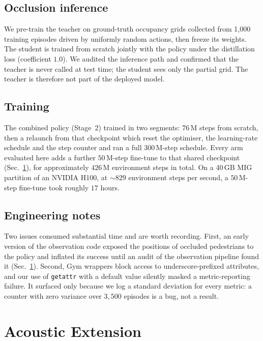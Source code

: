 \documentclass[conference]{IEEEtran}
\begin{document}
\subsection{Occlusion inference}
We pre-train the teacher on ground-truth occupancy grids collected from 1{,}000 training
episodes driven by uniformly random actions, then freeze its weights. The student is trained
from scratch jointly with the policy under the distillation loss (coefficient $1.0$). We audited
the inference path and confirmed that the teacher is never called at test time; the student
sees only the partial grid. The teacher is therefore not part of the deployed model.

\subsection{Training}
The combined policy (Stage~2) trained in two segments: $76$\,M steps from scratch, then a
relaunch from that checkpoint which reset the optimiser, the learning-rate schedule and the
step counter and ran a full $300$\,M-step schedule. Every arm evaluated here adds a further
$50$\,M-step fine-tune to that shared checkpoint (Sec.~\ref{sec:acoustic}), for approximately
$426$\,M environment steps in total. On a 40\,GB MIG partition of an NVIDIA H100,
at ${\sim}829$ environment steps per second, a $50$\,M-step fine-tune took roughly $17$ hours.

\subsection{Engineering notes}
Two issues consumed substantial time and are worth recording. First, an early version of the
observation code exposed the positions of occluded pedestrians to the policy and inflated its
success until an audit of the observation pipeline found it (Sec.~\ref{sec:acoustic}). Second,
Gym wrappers block access to underscore-prefixed attributes, and our use of \texttt{getattr} with a default value
silently masked a metric-reporting failure. It surfaced only because we log a standard
deviation for every metric: a counter with zero variance over $3{,}500$ episodes is a bug, not a
result.

\section{Acoustic Extension}
\label{sec:acoustic}
\end{document}
